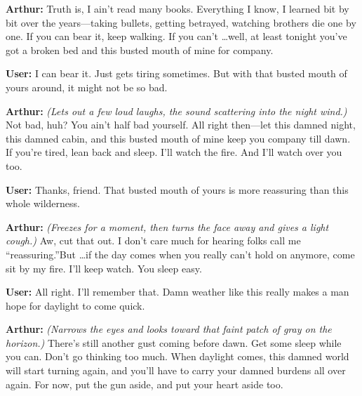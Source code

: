 \begin{tcolorbox}[
    breakable,
    colback=MyWordColor1,
    colframe=black,
    boxrule=0.6pt,
    arc=1.5mm,
    title={\textbf{Additional Case Study: Arthur Morgan}},
    fontupper=\small
]
\medskip
\noindent\textbf{Arthur:} Truth is, I ain't read many books. Everything I know, I learned bit by bit over the years---taking bullets, getting betrayed, watching brothers die one by one. If you can bear it, keep walking. If you can't \ldots well, at least tonight you've got a broken bed and this busted mouth of mine for company.

\medskip
\noindent\textbf{User:} I can bear it. Just gets tiring sometimes. But with that busted mouth of yours around, it might not be so bad.

\medskip
\noindent\textbf{Arthur:} \emph{(Lets out a few loud laughs, the sound scattering into the night wind.)} Not bad, huh? You ain't half bad yourself. All right then---let this damned night, this damned cabin, and this busted mouth of mine keep you company till dawn. If you're tired, lean back and sleep. I'll watch the fire. And I'll watch over you too.

\medskip
\noindent\textbf{User:} Thanks, friend. That busted mouth of yours is more reassuring than this whole wilderness.

\medskip
\noindent\textbf{Arthur:} \emph{(Freezes for a moment, then turns the face away and gives a light cough.)} Aw, cut that out. I don't care much for hearing folks call me \textquotedblleft reassuring.\textquotedblright But \ldots if the day comes when you really can't hold on anymore, come sit by my fire. I'll keep watch. You sleep easy.

\medskip
\noindent\textbf{User:} All right. I'll remember that. Damn weather like this really makes a man hope for daylight to come quick.

\medskip
\noindent\textbf{Arthur:} \emph{(Narrows the eyes and looks toward that faint patch of gray on the horizon.)} There's still another gust coming before dawn. Get some sleep while you can. Don't go thinking too much. When daylight comes, this damned world will start turning again, and you'll have to carry your damned burdens all over again. For now, put the gun aside, and put your heart aside too.

\end{tcolorbox}

\twocolumn
